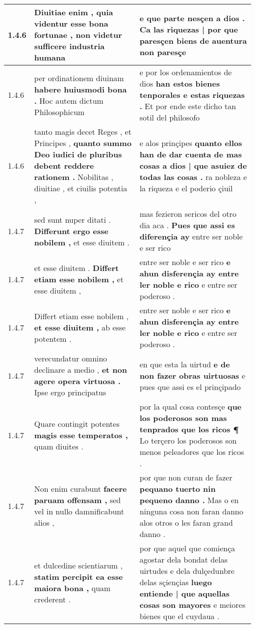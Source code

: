 \begin{tabular}{|p{1cm}|p{6.5cm}|p{6.5cm}|}
1.4.6 & Diuitiae enim , \textbf{ quia videntur esse bona fortunae , } non videtur sufficere industria humana & e que parte nesçen a dios . \textbf{ Ca las riquezas | por que paresçen biens de auentura } non paresçe \\\hline
1.4.6 & per ordinationem diuinam \textbf{ habere huiusmodi bona . } Hoc autem dictum Philosophicum & e por los ordenamientos de dios \textbf{ han estos bienes tenporales e estas riquezas . } Et por ende este dicho tan sotil del philosofo \\\hline
1.4.6 & tanto magis decet Reges , et Principes , \textbf{ quanto summo Deo iudici de pluribus debent reddere rationem . } Nobilitas , diuitiae , et ciuilis potentia , & e alos prinçipes \textbf{ quanto ellos han de dar cuenta de mas cosas a dios | que asuiez de todas las cosas . } ra nobleza e la riqueza e el poderio çiuil \\\hline
1.4.7 & sed sunt nuper ditati . \textbf{ Differunt ergo esse nobilem , } et esse diuitem . & mas fezieron sericos del otro dia aca . \textbf{ Pues que assi es diferençia ay } entre ser noble e ser rico \\\hline
1.4.7 & et esse diuitem . \textbf{ Differt etiam esse nobilem , } et esse diuitem , & entre ser noble e ser rico \textbf{ e ahun disferençia ay entre ler noble e rico } e entre ser poderoso . \\\hline
1.4.7 & Differt etiam esse nobilem , \textbf{ et esse diuitem , } ab esse potentem . & entre ser noble e ser rico \textbf{ e ahun disferençia ay entre ler noble e rico } e entre ser poderoso . \\\hline
1.4.7 & verecundatur omnino declinare a medio , \textbf{ et non agere opera virtuosa . } Ipse ergo principatus & en que esta la uirtud \textbf{ e de non fazer obras uirtuosas } e pues que assi es el prinçipado \\\hline
1.4.7 & Quare contingit potentes \textbf{ magis esse temperatos , } quam diuites . & por la qual cosa contesçe \textbf{ que los poderosos son mas tenprados que los ricos ¶ } Lo terçero los poderosos son menos peleadores que los ricos . \\\hline
1.4.7 & Non enim curabunt \textbf{ facere paruam offensam , } sed vel in nullo damnificabunt alios , & por que non curan de fazer \textbf{ pequano tuerto nin pequeno danno . } Mas o en ninguna cosa non faran danno alos otros o les faran grand danno . \\\hline
1.4.7 & et dulcedine scientiarum , \textbf{ statim percipit ea esse maiora bona , } quam crederent . & por que aquel que comiença agostar dela bondat delas uirtudes e dela dulçedunbre delas sçiençias \textbf{ luego entiende | que aquellas cosas son mayores } e meiores bienes que el cuydaua . \\\hline

\end{tabular}
